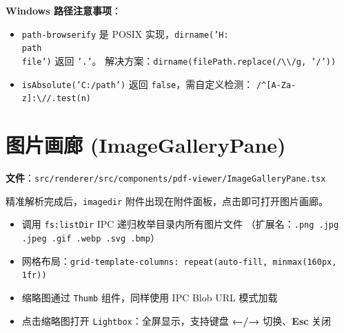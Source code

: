 \documentclass[12pt, a4paper]{article}
\begin{document}
\begin{center}
\end{center}

\textbf{Windows 路径注意事项}：
\begin{itemize}[leftmargin=2em, itemsep=2pt]
  \item \texttt{path-browserify} 是 POSIX 实现，\texttt{dirname('H:\\path\\file')} 返回 \texttt{'.'}。
        解决方案：\texttt{dirname(filePath.replace(/\textbackslash\textbackslash/g, '/'))}
  \item \texttt{isAbsolute('C:/path')} 返回 \texttt{false}，需自定义检测：
        \texttt{/\^{}[A-Za-z]:\textbackslash//.test(n)}
\end{itemize}

\section{图片画廊 (ImageGalleryPane)}

\textbf{文件}：\texttt{src/renderer/src/components/pdf-viewer/ImageGalleryPane.tsx}

精准解析完成后，\texttt{imagedir} 附件出现在附件面板，点击即可打开图片画廊。

\begin{itemize}[leftmargin=2em, itemsep=2pt]
  \item 调用 \texttt{fs:listDir} IPC 递归枚举目录内所有图片文件
        （扩展名：\texttt{.png .jpg .jpeg .gif .webp .svg .bmp}）
  \item 网格布局：\texttt{grid-template-columns: repeat(auto-fill, minmax(160px, 1fr))}
  \item 缩略图通过 \texttt{Thumb} 组件，同样使用 IPC Blob URL 模式加载
  \item 点击缩略图打开 \texttt{Lightbox}：全屏显示，支持键盘 \textbf{←/→} 切换、\textbf{Esc} 关闭
\end{itemize}
\end{document}
